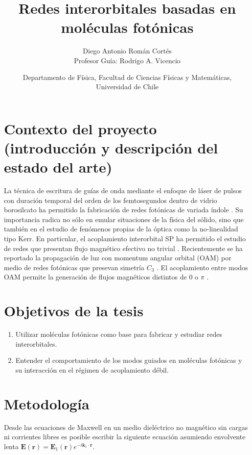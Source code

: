 \documentclass{article}
\author{Diego Antonio Román Cortés\\Profesor Guía: Rodrigo A. Vicencio}
\date{Departamento de Física, Facultad de Ciencias Físicas y Matemáticas, Universidad de Chile}
\title{Redes interorbitales basadas en moléculas fotónicas}
\begin{document}
 \maketitle

\section{Contexto del proyecto (introducción y descripción del estado del arte)}
	La técnica de escritura de guías de onda mediante el enfoque de láser de pulsos con duración temporal del orden de los femtosegundos dentro de vidrio borosilcato ha permitido la fabricación de redes fotónicas de variada índole \cite{femto, bics, artificialFB, FBdynamics}. Su importancia radica no sólo en emular situaciones de la física del sólido, sino que también en el estudio de fenómenos propias de la óptica como la no-linealidad tipo Kerr.
	En particular, el acoplamiento interorbital SP ha permitido el estudio de redes que presentan flujo magnético efectivo no trivial \cite{interorbital, OAMcaging, ABCaging}. Recientemente se ha reportado la propagación de luz con momentum angular orbital (OAM) por medio de redes fotónicas que presevan simetría $C_3$ \cite{vortex}. El acoplamiento entre modos OAM permite la generación de flujos magnéticos distintos de $0$ o $\pi$ \cite{vortextrim}.
\section{Objetivos de la tesis}
\begin{enumerate}
	\item Utilizar moléculas fotónicas como base para fabricar y estudiar redes interorbitales.
	\item Entender el comportamiento de los modos guiados en moléculas fotónicas y su interacción en el régimen de acoplamiento débil.
\end{enumerate}
\section{Metodología}

Desde las ecuaciones de Maxwell en un medio dieléctrico no magnético sin cargas ni corrientes libres es posible escribir la siguiente ecuación asumiendo envolvente lenta $\textbf{E}(\textbf{r}) = \textbf{E}_1(\textbf{r}) e^{-i \textbf{k}_1 \cdot \textbf{r}}$.
\end{document}
